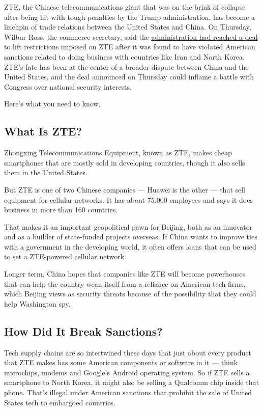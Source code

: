ZTE, the Chinese telecommunications giant that was on the brink of
collapse after being hit with tough penalties by the Trump
administration, has become a linchpin of trade relations between the
United States and China. On Thursday, Wilbur Ross, the commerce
secretary, said the
\href{https://www.nytimes.com/2018/06/07/business/us-china-zte-deal.html?action=click\&module=Top\%20Stories\&pgtype=Homepage}{administration
had reached a deal} to lift restrictions imposed on ZTE after it was
found to have violated American sanctions related to doing business with
countries like Iran and North Korea. ZTE's fate has been at the center
of a broader dispute between China and the United States, and the deal
announced on Thursday could inflame a battle with Congress over national
security interests.

Here's what you need to know.

\hypertarget{what-is-zte}{%
\subsection{What Is ZTE?}\label{what-is-zte}}

Zhongxing Telecommunications Equipment, known as ZTE, makes cheap
smartphones that are mostly sold in developing countries, though it also
sells them in the United States.

But ZTE is one of two Chinese companies --- Huawei is the other --- that
sell equipment for cellular networks. It has about 75,000 employees and
says it does business in more than 160 countries.

That makes it an important geopolitical pawn for Beijing, both as an
innovator and as a builder of state-funded projects overseas. If China
wants to improve ties with a government in the developing world, it
often offers loans that can be used to set a ZTE-powered cellular
network.

Longer term, China hopes that companies like ZTE will become powerhouses
that can help the country wean itself from a reliance on American tech
firms, which Beijing views as security threats because of the
possibility that they could help Washington spy.

\hypertarget{how-did-it-break-sanctions}{%
\subsection{How Did It Break
Sanctions?}\label{how-did-it-break-sanctions}}

Tech supply chains are so intertwined these days that just about every
product that ZTE makes has some American components or software in it
--- think microchips, modems and Google's Android operating system. So
if ZTE sells a smartphone to North Korea, it might also be selling a
Qualcomm chip inside that phone. That's illegal under American sanctions
that prohibit the sale of United States tech to embargoed countries.

